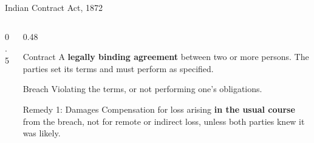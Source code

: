 \documentclass[aspectratio=169,11pt,xcolor={table}]{beamer}
\begin{document}
\begin{frame}{Indian Contract Act, 1872}
  \begin{columns}[c]
    \begin{column}{0.5\textwidth}
      \centering
    \end{column}
    \begin{column}{0.48\textwidth}
      \begin{block}{Contract}
        \small A \textbf{legally binding agreement} between two or more persons. The parties set its terms and must perform as specified.
      \end{block}
      \begin{alertblock}{Breach}
        \small Violating the terms, or not performing one's obligations.
      \end{alertblock}
      \begin{exampleblock}{Remedy 1: Damages}
        \small Compensation for loss arising \textbf{in the usual course} from the breach, not for remote or indirect loss, unless both parties knew it was likely.
      \end{exampleblock}
    \end{column}
  \end{columns}
\end{frame}
\end{document}
